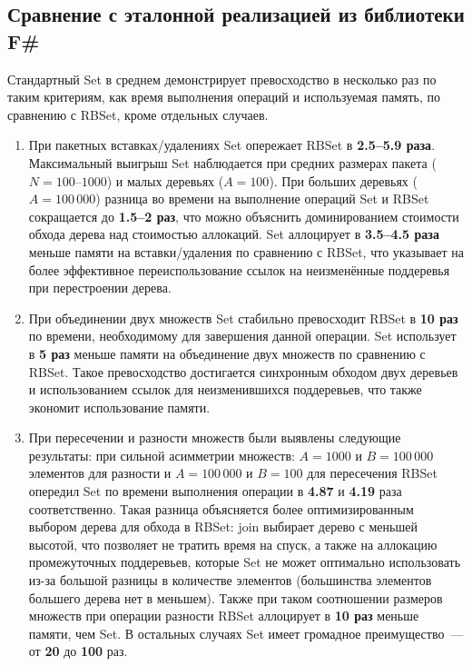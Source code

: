 \documentclass[a4paper]{article}
\begin{document}
\subsection{Сравнение с эталонной реализацией из библиотеки F\#}
Стандартный Set в среднем демонстрирует превосходство в несколько раз по таким критериям, как время выполнения операций и используемая память, 
по сравнению с RBSet, кроме отдельных случаев.
\begin{enumerate}
    \item При пакетных вставках/удалениях Set опережает RBSet в \textbf{2.5--5.9 раза}.
          Максимальный выигрыш Set наблюдается при средних размерах
          пакета ($N = 100$--$1000$) и малых деревьях ($A = 100$).
          При больших деревьях ($A = 100\,000$) разница во времени на выполнение 
          операций Set и RBSet сокращается до \textbf{1.5–2 раз}, что можно объяснить 
          доминированием стоимости обхода дерева над стоимостью аллокаций.
          Set аллоцирует в \textbf{3.5--4.5 раза}
          меньше памяти на вставки/удаления по сравнению с RBSet, 
          что указывает на более эффективное переиспользование ссылок на неизменённые поддеревья при перестроении дерева.
    \item При объединении двух множеств Set стабильно превосходит RBSet в \textbf{10 раз} по времени, необходимому для 
          завершения данной операции.
          Set использует в \textbf{5 раз} меньше памяти на объединение двух множеств по сравнению с RBSet.
          Такое превосходство достигается синхронным обходом двух деревьев и использованием ссылок для неизменившихся поддеревьев, 
          что также экономит использование памяти.
    \item При пересечении и разности множеств были выявлены следующие результаты: 
          при сильной асимметрии множеств: $A = 1000$ и $B = 100\,000$ элементов для разности и 
           $A = 100\,000$ и $B = 100$ для пересечения RBSet опередил Set по времени выполнения операции в \textbf{4.87} и \textbf{4.19} раза соответственно.
           Такая разница объясняется более оптимизированным выбором дерева для обхода в RBSet: join выбирает дерево с меньшей высотой, что позволяет не тратить 
           время на спуск, а также на аллокацию промежуточных поддеревьев, которые Set не может оптимально использовать из-за большой разницы в количестве 
           элементов (большинства элементов большего дерева нет в меньшем). Также при таком соотношении размеров множеств при операции разности RBSet аллоцирует 
           в \textbf{10 раз} меньше памяти, чем Set. В остальных случаях Set имеет громадное преимущество~--- от \textbf{20} до \textbf{100} раз.
\end{enumerate}  
\end{document}
